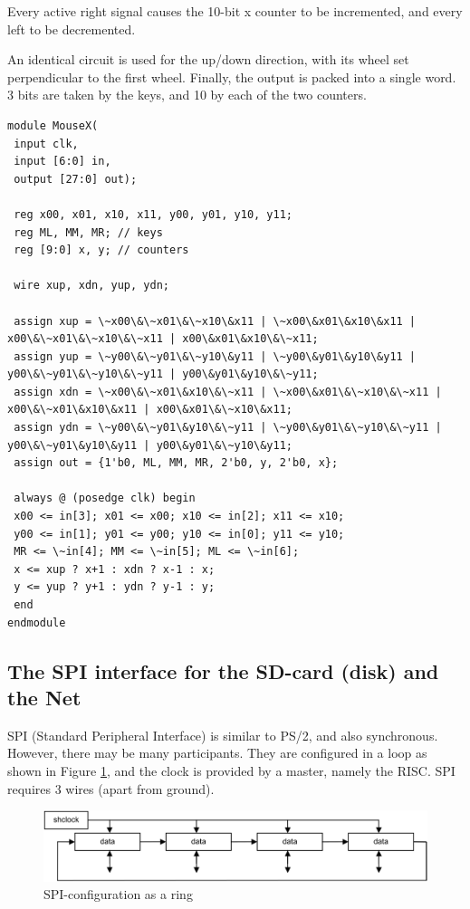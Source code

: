 Every active right signal causes the 10-bit x counter to be incremented, and every left to be
decremented.

An identical circuit is used for the up/down direction, with its wheel set perpendicular to the first
wheel. Finally, the output is packed into a single word. 3 bits are taken by the keys, and 10 by each of
the two counters.
\begin{verbatim}
module MouseX(
 input clk,
 input [6:0] in,
 output [27:0] out);

 reg x00, x01, x10, x11, y00, y01, y10, y11;
 reg ML, MM, MR; // keys
 reg [9:0] x, y; // counters

 wire xup, xdn, yup, ydn;

 assign xup = \~x00\&\~x01\&\~x10\&x11 | \~x00\&x01\&x10\&x11 | x00\&\~x01\&\~x10\&\~x11 | x00\&x01\&x10\&\~x11;
 assign yup = \~y00\&\~y01\&\~y10\&y11 | \~y00\&y01\&y10\&y11 | y00\&\~y01\&\~y10\&\~y11 | y00\&y01\&y10\&\~y11;
 assign xdn = \~x00\&\~x01\&x10\&\~x11 | \~x00\&x01\&\~x10\&\~x11 | x00\&\~x01\&x10\&x11 | x00\&x01\&\~x10\&x11;
 assign ydn = \~y00\&\~y01\&y10\&\~y11 | \~y00\&y01\&\~y10\&\~y11 | y00\&\~y01\&y10\&y11 | y00\&y01\&\~y10\&y11;
 assign out = {1'b0, ML, MM, MR, 2'b0, y, 2'b0, x};

 always @ (posedge clk) begin
 x00 <= in[3]; x01 <= x00; x10 <= in[2]; x11 <= x10;
 y00 <= in[1]; y01 <= y00; y10 <= in[0]; y11 <= y10;
 MR <= \~in[4]; MM <= \~in[5]; ML <= \~in[6];
 x <= xup ? x+1 : xdn ? x-1 : x;
 y <= yup ? y+1 : ydn ? y-1 : y;
 end
endmodule
\end{verbatim}

\subsection{The SPI interface for the SD-card (disk) and the Net}
\label{sub:spi}
SPI (Standard Peripheral Interface) is similar to PS/2, and also synchronous. However, there may
be many participants. They are configured in a loop as shown in Figure \ref{fig:ring}, and the clock is
provided by a master, namely the RISC. SPI requires 3 wires (apart from ground).
\begin{figure}[h!]
  \centering
  \includegraphics[width=.9\textwidth]{i/G/6.png}
  \caption{SPI-configuration as a ring}
  \label{fig:ring}
\end{figure}


